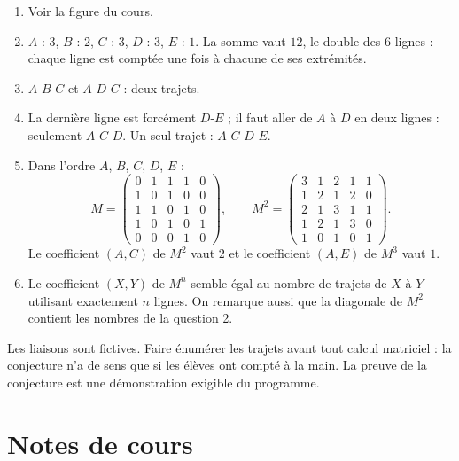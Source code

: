 \begin{solution}[Activité]
\begin{enumerate}
\item Voir la figure du cours.
\item $A$ : $3$, $B$ : $2$, $C$ : $3$, $D$ : $3$, $E$ : $1$. La somme vaut $12$, le double des $6$ lignes : chaque ligne est comptée une fois à chacune de ses extrémités.
\item $A$-$B$-$C$ et $A$-$D$-$C$ : deux trajets.
\item La dernière ligne est forcément $D$-$E$ ; il faut aller de $A$ à $D$ en deux lignes : seulement $A$-$C$-$D$. Un seul trajet : $A$-$C$-$D$-$E$.
\item Dans l'ordre $A$, $B$, $C$, $D$, $E$ :
\[M=\begin{pmatrix}0&1&1&1&0\\1&0&1&0&0\\1&1&0&1&0\\1&0&1&0&1\\0&0&0&1&0\end{pmatrix},\qquad M^2=\begin{pmatrix}3&1&2&1&1\\1&2&1&2&0\\2&1&3&1&1\\1&2&1&3&0\\1&0&1&0&1\end{pmatrix}.\]
Le coefficient $(A,C)$ de $M^2$ vaut $2$ et le coefficient $(A,E)$ de $M^3$ vaut $1$.
\item Le coefficient $(X,Y)$ de $M^n$ semble égal au nombre de trajets de $X$ à $Y$ utilisant exactement $n$ lignes. On remarque aussi que la diagonale de $M^2$ contient les nombres de la question 2.
\end{enumerate}
\end{solution}
\begin{teachernote}
Les liaisons sont fictives. Faire énumérer les trajets avant tout calcul matriciel : la conjecture n'a de sens que si les élèves ont compté à la main. La preuve de la conjecture est une démonstration exigible du programme.
\end{teachernote}

\mxnewpage
\section{Notes de cours}
